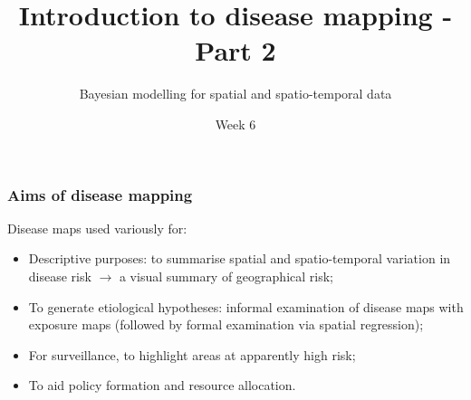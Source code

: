 \documentclass[12pt]{beamer}
\title{Introduction to disease mapping - Part 2}
\subtitle{}
\author{Bayesian modelling for spatial and spatio-temporal data}
\institute{MSc in Epidemiology}
\date{Week 6}
\begin{document}
\begin{frame}[t]
  \titlepage
\end{frame}


\begin{frame}
    \frametitle{Aims of disease mapping}
Disease maps used variously for:
\begin{itemize} \setlength\itemsep{\fill}
\item Descriptive purposes: to summarise spatial and spatio-temporal variation in disease risk $\rightarrow$ a visual summary of geographical risk;
\item To generate etiological hypotheses: informal examination of disease maps with exposure maps (followed by formal examination via spatial regression);
\item For surveillance, to highlight areas at apparently high risk;
\item To aid policy formation and resource allocation.
\end{itemize}
\end{frame}
\end{document}
